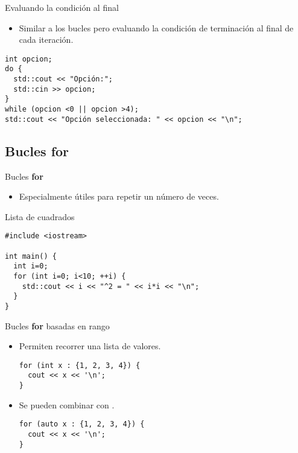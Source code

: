 \begin{frame}[t,fragile]{Evaluando la condición al final}
\begin{itemize}
  \item Similar a los bucles  pero evaluando la
        condición de terminación al final de cada iteración.
\end{itemize}
\begin{lstlisting}
int opcion;
do {
  std::cout << "Opción:";
  std::cin >> opcion;
} 
while (opcion <0 || opcion >4);
std::cout << "Opción seleccionada: " << opcion << "\n";
\end{lstlisting}
\end{frame}

\subsection{Bucles \textbf{for}}

\begin{frame}[t,fragile]{Bucles \textbf{for}}
\begin{itemize}
  \item Especialmente útiles para repetir un número de veces.
\end{itemize}
\begin{block}{Lista de cuadrados}
\begin{lstlisting}
#include <iostream>

int main() {
  int i=0;
  for (int i=0; i<10; ++i) {
    std::cout << i << "^2 = " << i*i << "\n";
  }
}
\end{lstlisting}
\end{block}
\end{frame}

\begin{frame}[t,fragile]{Bucles \textbf{for} basadas en rango}
\begin{itemize}
  \item Permiten recorrer una lista de valores.
\begin{lstlisting}
for (int x : {1, 2, 3, 4}) {
  cout << x << '\n';
}
\end{lstlisting}
  \item Se pueden combinar con .
\begin{lstlisting}
for (auto x : {1, 2, 3, 4}) {
  cout << x << '\n';
}
\end{lstlisting}

\end{itemize}
\end{frame}
